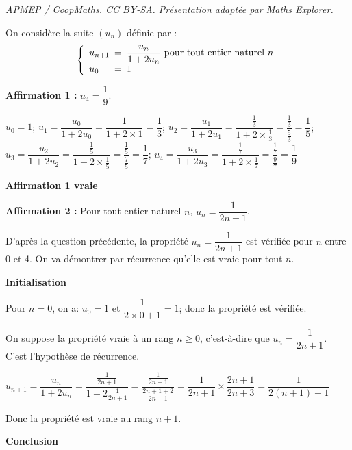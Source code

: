 \documentclass[10pt]{article}
\begin{document}
\noindent\textit{APMEP / CoopMaths. CC BY-SA. Présentation adaptée par Maths Explorer.}\par\medskip
On considère la suite $\left(u_{n}\right)$ définie par :
\[\left\{\begin{array}{l !{=} l}
u_{n + 1} & \dfrac{u_{n}}{1 + 2 u_{n}} \text { pour tout entier naturel } n 
\\ u_{0} & 1
\end{array}\right.\]

\begin{list}{\textbullet}{}
\item \textbf{Affirmation 1 :} \og{} $u_{4} = \dfrac{1}{9}$. \fg{}

$u_0=1$; 
$u_1=\dfrac{u_0}{1+2u_0} = \dfrac{1}{1+2\times 1}=\dfrac{1}{3}$;
$u_2=\dfrac{u_1}{1+2u_1} = \dfrac{\frac{1}{3}}{1+2\times \frac{1}{3}}
= \dfrac{\frac{1}{3}}{\frac{5}{3}} = \dfrac{1}{5}$;\\
$u_3=\dfrac{u_2}{1+2u_2} = \dfrac{\frac{1}{5}}{1+2\times \frac{1}{5}}
= \dfrac{\frac{1}{5}}{\frac{7}{5}} = \dfrac{1}{7}$;
$u_4=\dfrac{u_3}{1+2u_3} = \dfrac{\frac{1}{7}}{1+2\times \frac{1}{7}}
= \dfrac{\frac{1}{7}}{\frac{9}{7}} = \dfrac{1}{9}$

\hfill\textbf{Affirmation 1 vraie}

\item \textbf{Affirmation 2 :} \og{}Pour tout entier naturel $n$, $u_{n} = \dfrac{1}{2 n + 1}$.\fg{}

D'après la question précédente, la propriété \og $u_{n} = \dfrac{1}{2 n + 1}$ \fg{} est vérifiée pour $n$ entre 0 et 4. On va démontrer par récurrence qu'elle est vraie pour tout $n$.

\begin{list}{\textbullet}{}
\item \textbf{Initialisation}

Pour $n=0$, on a: $u_0=1$ et $\dfrac{1}{2\times 0 +1}=1$; donc la propriété est vérifiée.

\item On suppose la propriété vraie à un rang $n\geqslant 0$, c'est-à-dire que $u_n=\dfrac{1}{2n+1}$. C'est l'hypothèse de récurrence.

$u_{n+1}= \dfrac{u_n}{1+2u_n}
= \dfrac{\frac{1}{2n+1}}{1+2\frac{1}{2n+1}}
= \dfrac{\frac{1}{2n+1}}{\frac{2n+1+2}{2n+1}}
= \dfrac{1}{2n+1}\times \dfrac{2n+1}{2n+3}
=\dfrac{1}{2(n+1)+1}$

Donc la propriété est vraie au rang $n+1$.

\item \textbf{Conclusion}


\end{list}
\end{list}
\end{document}

